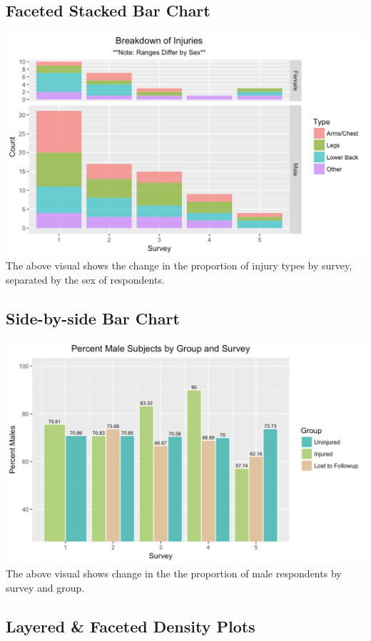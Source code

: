 \documentclass[]{article}
\begin{document}
\subsection{Faceted Stacked Bar Chart}\label{faceted-stacked-bar-chart}

\includegraphics[width=1\linewidth]{images/BreakdownInjuries} The above
visual shows the change in the proportion of injury types by survey,
separated by the sex of respondents.

\subsection{Side-by-side Bar Chart}\label{side-by-side-bar-chart}

\includegraphics[width=1\linewidth]{images/PercentMaleSubjects} The
above visual shows change in the the proportion of male respondents by
survey and group.

\subsection{Layered \& Faceted Density
Plots}\label{layered-faceted-density-plots}
\end{document}
